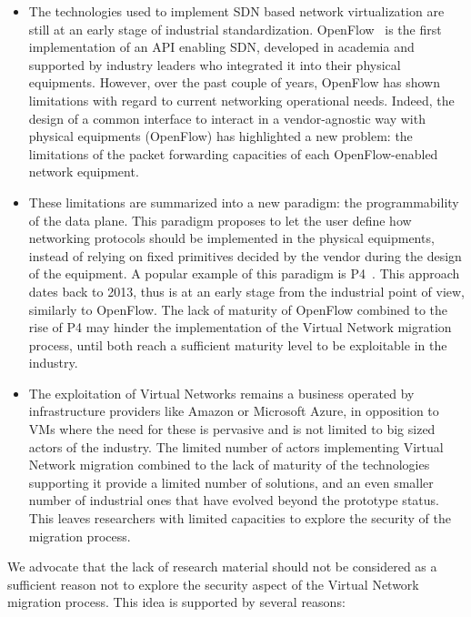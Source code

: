 \begin{itemize}
    \item The technologies used to implement SDN based network virtualization are still at an early stage of industrial standardization. OpenFlow~\cite{Openflow-McKeown2008} is the first implementation of an API enabling SDN, developed in academia and supported by industry leaders who integrated it into their physical equipments. However, over the past couple of years, OpenFlow has shown limitations with regard to current networking operational needs. Indeed, the design of a common interface to interact in a vendor-agnostic way with physical equipments (\ie OpenFlow) has highlighted a new problem: the limitations of the packet forwarding capacities of each OpenFlow-enabled network equipment. 
    
    \item These limitations are summarized into a new paradigm: the programmability of the data plane.
    This paradigm proposes to let the user define how networking protocols should be implemented in the physical equipments, instead of relying on fixed primitives decided by the vendor during the design of the equipment. A popular example of this paradigm is P4~\cite{P4}.
    This approach dates back to 2013, thus is at an early stage from the industrial point of view, similarly to OpenFlow.
    The lack of maturity of OpenFlow combined to the rise of P4 may hinder the implementation of the Virtual Network migration process, until both reach a sufficient maturity level to be exploitable in the industry.
    
    \item The exploitation of Virtual Networks remains a business operated by infrastructure providers like Amazon or Microsoft Azure, in opposition to VMs where the need for these is pervasive and is not limited to big sized actors of the industry. The limited number of actors implementing Virtual Network migration combined to the lack of maturity of the technologies supporting it provide a limited number of solutions, and an even smaller number of industrial ones that have evolved beyond the prototype status. This leaves researchers with limited capacities to explore the security of the migration process.
\end{itemize}

We advocate that the lack of research material should not be considered as a sufficient reason not to explore the security aspect of the Virtual Network migration process. This idea is supported by several reasons:

